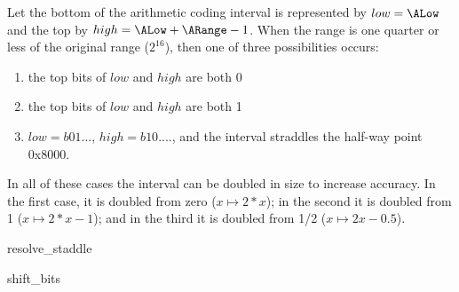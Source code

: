 \begin{informative}
Let the bottom of the arithmetic coding interval is represented by $low=\ALow$ and the top by $high=\ALow+\ARange-1$.
When the range is one quarter or less of the original range ($2^{16}$), then one of three possibilities occurs:
\begin{enumerate}
\item the top bits of $low$ and $high$ are both 0
\item the top bits of $low$ and $high$ are both 1
\item $low=b01...$, $high=b10....$,  and the interval straddles the half-way point 0x8000. 
\end{enumerate}

In all of these cases the interval can be doubled in size to increase accuracy. In the first case, it is doubled from zero ($x\mapsto 2*x$); 
in the second it is doubled from 1 ($x\mapsto 2*x-1$); and in the third it is doubled from 1/2 ($x\mapsto 2x-0.5$).
 
\end{informative}

\begin{pseudo}{resolve\_staddle}{}
\end{pseudo}

\begin{pseudo}{shift\_bits}{}
\end{pseudo}

